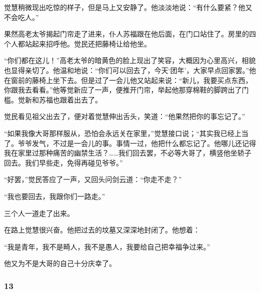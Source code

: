 \par 觉慧稍微现出吃惊的样子，但是马上又安静了。他淡淡地说：“有什么要紧？他又不会吃人。”
\par 果然高老太爷揭起门帘走了进来，仆人苏福跟在他后面，在门口站住了。房里的四个人都站起来招呼他。觉民还把藤椅让给他坐。
\par “你们都在这儿！”高老太爷的暗黄色的脸上现出了笑容，大概因为心里高兴，相貌也显得亲切了。他温和地说：“你们可以回去了，今天‘团年’，大家早点回家罢。”他在窗前的藤椅上坐下去。但是过了一会儿他又站起来说：“新儿，我要买点东西，你跟我去看看。”他等觉新应了一声，便推开门帘，举起他那穿棉鞋的脚跨出了门槛。觉新和苏福也跟着出去了。
\par 觉民看见祖父出去了，便对着觉慧伸出舌头，笑道：“他果然把你的事忘记了。”
\par “如果我像大哥那样服从，恐怕会永远关在家里，”觉慧接口说；“其实我已经上当了。爷爷发气，不过是一会儿的事。事情一过，他把什么都忘记了。他哪儿还记得我在家里过那种痛苦的幽禁生活？……我们回去罢，不必等大哥了，横竖他坐轿子回去。我们早些走，免得再碰见爷爷。”
\par “好罢，”觉民答应了一声，又回头问剑云道：“你走不走？”
\par “我也要回去，我跟你们一路走。”
\par 三个人一道走了出来。
\par 在路上觉慧很兴奋。他把过去的坟墓又深深地封闭了。他想着：
\par “我是青年，我不是畸人，我不是愚人，我要给自己把幸福争过来。”
\par 他又为不是大哥的自己十分庆幸了。


\subsubsection*{13}

